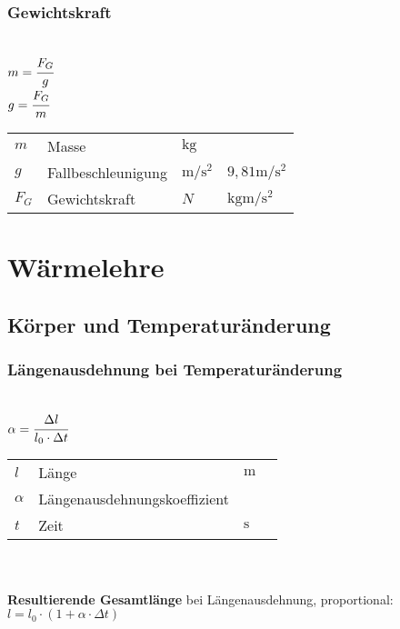 \documentclass[a4paper, 10pt]{article}
\begin{document}
\subsubsection{Gewichtskraft}
\begin{minipage}{0.45\textwidth}

 \\
$m = \cfrac{F_G}{g}$ \\
$g = \cfrac{F_G}{m}$

\end{minipage}
\begin{minipage}{0.45\textwidth}

\begin{tabular}{llll}
$m$ & Masse & $\si{\kilo\gram}$ & \\
$g$ & Fallbeschleunigung & $\si{\metre\per\square\second}$ & $9,81 \si{\metre\per\square\second}$ \\
$F_G$ & Gewichtskraft & $N$ & $\si{\kilogram\metre\per\square\second}$ \\
\end{tabular}

\end{minipage}

\section{Wärmelehre}

\subsection{Körper und Temperaturänderung}
\subsubsection{Längenausdehnung bei Temperaturänderung}
\begin{minipage}{0.45\textwidth}
  \\
$\alpha = \cfrac{\Delta l}{l_0 \cdot \Delta t}$
\end{minipage}
\begin{minipage}{0.45\textwidth}

\begin{tabular}{llll}
$l$ & Länge & $\si{\meter} $ & $ $ \\
$\alpha$ & Längenausdehnungskoeffizient &  & \\
$t$ & Zeit & $\si{\second}$ & \\
\end{tabular}

\end{minipage}
\\\\
\textbf{Resultierende Gesamtlänge} bei Längenausdehnung, proportional: \\
$l = l_{0} \cdot \left( 1 + \alpha \cdot \Delta t \right) $
\end{document}
